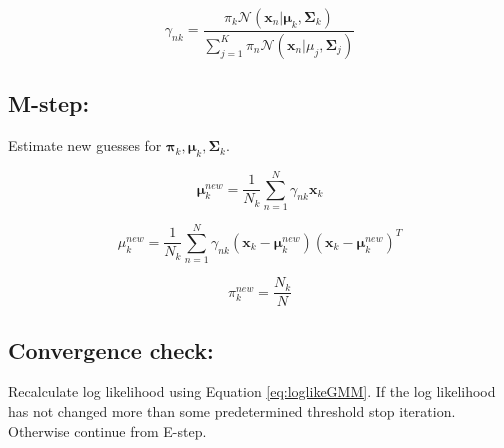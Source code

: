 \begin{equation}
\gamma_{nk} = 
\frac
{\pi_{k}\mathcal{N}(\mathbf{x}_{n}|\mathbf{\mu}_{k},\mathbf{\Sigma}_{k})}
{\sum_{j=1}^{K} \pi_{n}\mathcal{N}(\mathbf{x}_{n}|\mu_{j},\mathbf{\Sigma}_{j})}
\end{equation}

\subsection*{M-step:}
Estimate new guesses for $ \mathbf{\pi}_{k}, \mathbf{\mu}_{k}, \mathbf{\Sigma}_{k} $.

\begin{equation}
\mathbf{\mu}_{k}^{new} = 
\frac{1}{N_{k}}
\sum_{n=1}^{N} 
\gamma_{nk}
\mathbf{x}_{k}
\end{equation}

\begin{equation}
\mu_{k}^{new} = 
\frac{1}{N_{k}}
\sum_{n=1}^{N} 
\gamma_{nk}
(\mathbf{x}_{k} - \mathbf{\mu}_{k}^{new})
(\mathbf{x}_{k} - \mathbf{\mu}_{k}^{new})^{T}
\end{equation}

\begin{equation}
\pi_{k}^{new} =
\frac
{N_{k}}
{N}
\end{equation}

\subsection*{Convergence check:}

Recalculate log likelihood using Equation \ref{eq:loglikeGMM}.
If the log likelihood has not changed more than some predetermined threshold stop iteration.
Otherwise continue from E-step.

